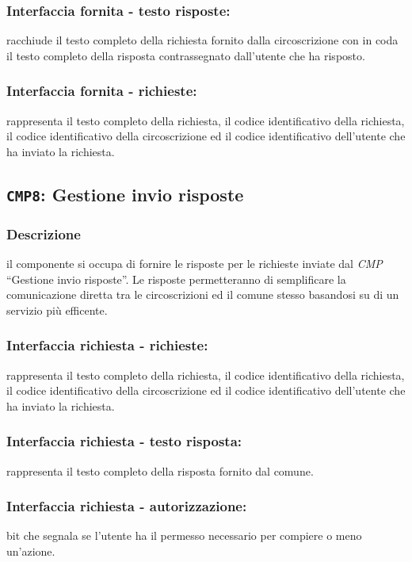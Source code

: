         \subsubsection{Interfaccia fornita - testo risposte:}
            racchiude il testo completo della richiesta fornito dalla circoscrizione con in coda il testo completo della risposta contrassegnato dall'utente che ha risposto.
        \subsubsection{Interfaccia fornita - richieste:}
            rappresenta il testo completo della richiesta, il codice identificativo della richiesta, il codice identificativo della circoscrizione ed il codice identificativo dell'utente che ha inviato la richiesta.

    \subsection{\texttt{CMP8}: Gestione invio risposte}
        \subsubsection{Descrizione}
            il componente si occupa di fornire le risposte per le richieste inviate dal \textit{CMP} ``Gestione invio risposte''. Le risposte permetteranno di semplificare la comunicazione diretta tra le circoscrizioni ed il comune stesso basandosi su di un servizio più efficente.
        \subsubsection{Interfaccia richiesta - richieste:}
            rappresenta il testo completo della richiesta, il codice identificativo della richiesta, il codice identificativo della circoscrizione ed il codice identificativo dell'utente che ha inviato la richiesta.
        \subsubsection{Interfaccia richiesta - testo risposta:}
            rappresenta il testo completo della risposta fornito dal comune.
        \subsubsection{Interfaccia richiesta - autorizzazione:}
            bit che segnala se l'utente ha il permesso necessario per compiere o meno un'azione.
